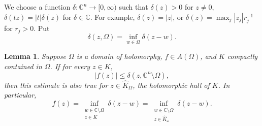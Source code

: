 \documentclass[12pt]{report}
\newcommand{\CC}{\mathbb{C}}
\newtheorem{lemma}[theorem]{Lemma}
\theoremstyle{definition}
\begin{document}
We choose a function $\delta: \CC^n \to [0, \infty)$ such that $\delta(z) > 0$ for $z \neq 0$, $\delta(tz) = |t|\delta(z)$ for $\delta \in \CC$. For example, $\delta(z) = |z|$, or $\delta(z) = \max_j |z_j|r_j^{-1}$ for $r_j > 0$. Put
$$\delta(z, \Omega) = \inf_{w \in \Omega} \delta(z - w).$$

\begin{lemma}
    Suppose $\Omega$ is a domain of holomorphy, $f \in A(\Omega)$, and $K$ compactly contained in $\Omega$. If for every $z \in K$,
    $$|f(z)| \leq \delta(z, \CC^n \setminus \Omega),$$
    then this estimate is also true for $z \in \hat K_\Omega$, the holomorphic hull of $K$. In particular, 
    $$f(z) = \inf_{\substack{w \in \CC \setminus \Omega\\z \in K}} \delta(z - w) = \inf_{\substack{w \in \CC \setminus \Omega\\z \in \hat K_\omega}}
 \delta(z - w).$$\end{lemma}
\end{document}
